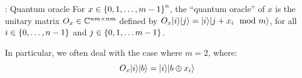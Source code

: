 \begin{defbox}{: Quantum oracle}
    For $x \in \set{0, 1, \ldots, m-1}^n$, the ``quantum oracle'' of $x$ is the unitary matrix $O_x \in \mathbb{C}^{nm \times nm}$ defined by $O_x\lvert i \rangle\lvert j \rangle = \lvert i \rangle\lvert j + x_i \mod m \rangle$, for all $i \in \set{0, \ldots, n -1 }$ and $j \in \set{0, 1, \ldots m - 1}$. 

    In particular, we often deal with the case where $m = 2$, where:
    \begin{equation}
        O_x\lvert i \rangle\lvert b \rangle = \lvert i \rangle\lvert b \oplus x_i \rangle
    \end{equation}
\end{defbox}
